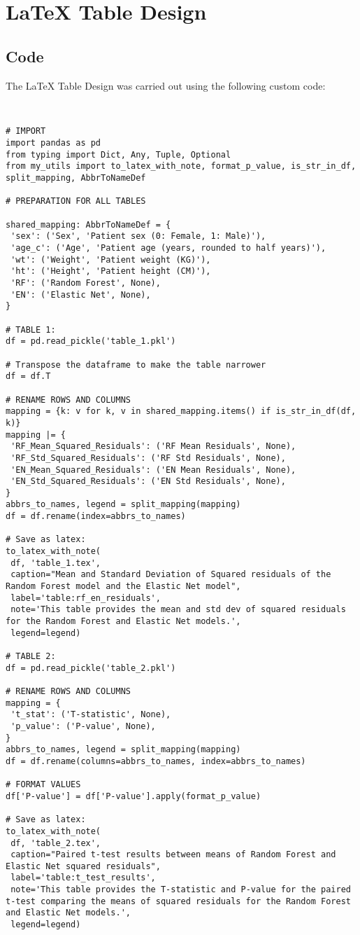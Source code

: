 \documentclass[11pt]{article}
\begin{document}
\section{LaTeX Table Design}
\subsection{{Code}}
The LaTeX Table Design was carried out using the following custom code:

\begin{verbatim}


# IMPORT
import pandas as pd
from typing import Dict, Any, Tuple, Optional
from my_utils import to_latex_with_note, format_p_value, is_str_in_df, split_mapping, AbbrToNameDef

# PREPARATION FOR ALL TABLES

shared_mapping: AbbrToNameDef = {
 'sex': ('Sex', 'Patient sex (0: Female, 1: Male)'),
 'age_c': ('Age', 'Patient age (years, rounded to half years)'),
 'wt': ('Weight', 'Patient weight (KG)'),
 'ht': ('Height', 'Patient height (CM)'),
 'RF': ('Random Forest', None),
 'EN': ('Elastic Net', None),
}

# TABLE 1:
df = pd.read_pickle('table_1.pkl')

# Transpose the dataframe to make the table narrower
df = df.T

# RENAME ROWS AND COLUMNS 
mapping = {k: v for k, v in shared_mapping.items() if is_str_in_df(df, k)} 
mapping |= {
 'RF_Mean_Squared_Residuals': ('RF Mean Residuals', None),
 'RF_Std_Squared_Residuals': ('RF Std Residuals', None),
 'EN_Mean_Squared_Residuals': ('EN Mean Residuals', None),
 'EN_Std_Squared_Residuals': ('EN Std Residuals', None),
}
abbrs_to_names, legend = split_mapping(mapping)
df = df.rename(index=abbrs_to_names)

# Save as latex:
to_latex_with_note(
 df, 'table_1.tex',
 caption="Mean and Standard Deviation of Squared residuals of the Random Forest model and the Elastic Net model", 
 label='table:rf_en_residuals',
 note='This table provides the mean and std dev of squared residuals for the Random Forest and Elastic Net models.',
 legend=legend)

# TABLE 2:
df = pd.read_pickle('table_2.pkl')

# RENAME ROWS AND COLUMNS
mapping = {
 't_stat': ('T-statistic', None),
 'p_value': ('P-value', None),
}
abbrs_to_names, legend = split_mapping(mapping)
df = df.rename(columns=abbrs_to_names, index=abbrs_to_names)

# FORMAT VALUES
df['P-value'] = df['P-value'].apply(format_p_value)

# Save as latex:
to_latex_with_note(
 df, 'table_2.tex',
 caption="Paired t-test results between means of Random Forest and Elastic Net squared residuals", 
 label='table:t_test_results',
 note='This table provides the T-statistic and P-value for the paired t-test comparing the means of squared residuals for the Random Forest and Elastic Net models.',
 legend=legend)


\end{verbatim}
\end{document}
